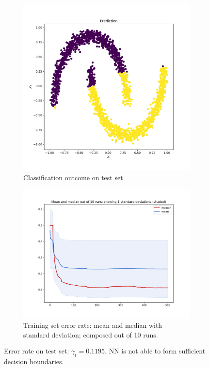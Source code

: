 \documentclass[12pt]{article}
\begin{document}
\begin{figure}[htbp]
\captionsetup[subfigure]{labelformat=empty}
\centering
	\begin{subfigure}{.48\textwidth}
	\centering
	\includegraphics[scale=0.3]{pics/Prediction_i}
	\caption{Classification outcome on test set}
	\label{fig:i_a}
	\end{subfigure}
	\begin{subfigure}{.48\textwidth}
	\centering
	\includegraphics[scale=0.3]{pics/i_ens}
	\caption{Training set error rate: mean and median with standard deviation; composed out of 10 runs.}
	\label{fig:i_b}
	\end{subfigure}
\caption{Error rate on test set: $\gamma_t = 0.1195$. NN is not able to form sufficient decision boundaries.}
\label{fig:res_i}
\end{figure}
\end{document}

